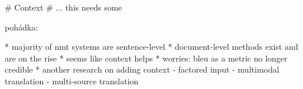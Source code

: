 \begin{markdown}

# Context #
... this needs some

pohádka:

* majority of nmt systems are sentence-level
* document-level methods exist and are on the rise
* seems like context helps
* worries: bleu as a metric no longer credible
* another research on adding context
    - factored input
	- multimodal translation
	- multi-source translation
	

\end{markdown}
